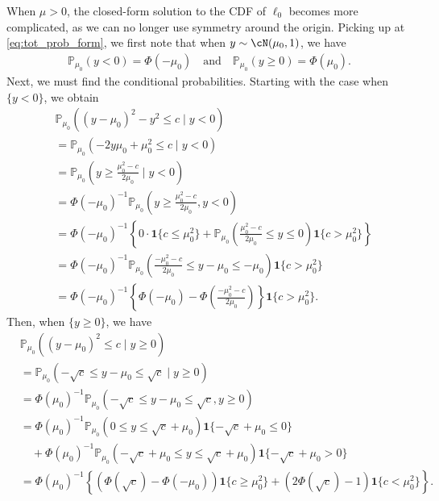 \documentclass[11pt]{article}
\numberwithin{equation}{section}
\numberwithin{figure}{section}
\begin{document}
When $\mu > 0$, the closed-form solution to the CDF of $\ell_0$ becomes more complicated, as we can no longer use symmetry around the origin. 
Picking up at \eqref{eq:tot_prob_form}, we first note that when $y \sim \cN(\mu_0, 1)$, we have
\begin{align*}
    \mathbb{P}_{\mu_0} \left(y < 0 \right) = \Phi(- \mu_0)
    \quad
    \text{and}
    \quad
    \mathbb{P}_{\mu_0} \left(y \geq 0 \right) = \Phi(\mu_0).
\end{align*}
Next, we must find the conditional probabilities. 
Starting with the case when $\{y < 0 \}$, we obtain
\begin{align}
    &\mathbb{P}_{\mu_0} \left((y - \mu_0)^2 - y^2 \leq c \mid y < 0 \right) \\ 
    &= \mathbb{P}_{\mu_0} \left(-2 y \mu_0 + \mu_0^2 \leq c \mid y < 0 \right) \nonumber \\
    &= \mathbb{P}_{\mu_0} \left(y \geq \frac{\mu_0^2 - c}{2 \mu_0} \mid y < 0 \right) \nonumber \\
    &= \Phi(- \mu_0)^{-1} \mathbb{P}_{\mu_0} \left(y \geq \frac{\mu_0^2 - c}{2 \mu_0}, y < 0 \right) \nonumber \\
    &= \Phi(- \mu_0)^{-1} \left\{ 0 \cdot \bm{1} \{c \leq \mu_0^2 \} + \mathbb{P}_{\mu_0} \left( \frac{\mu_0^2 - c}{2 \mu_0} \leq y \leq 0 \right) \bm{1} \{c > \mu_0^2 \} \right\} \nonumber \\
    &= \Phi(- \mu_0)^{-1} \mathbb{P}_{\mu_0} \left( \frac{-\mu_0^2 - c}{2 \mu_0} \leq y - \mu_0 \leq - \mu_0 \right) \bm{1} \{ c > \mu_0^2 \} \nonumber \\
    &= \Phi(- \mu_0)^{-1} \left\{\Phi(- \mu_0) - \Phi\left(\frac{-\mu_0^2 - c}{2 \mu_0} \right) \right\}\bm{1} \{ c > \mu_0^2 \}. \label{eq:cond_y_l_0}
\end{align}
Then, when $\{y \geq 0 \}$, we have
\begin{align}
    & \mathbb{P}_{\mu_0} \left((y - \mu_0)^2 \leq c \mid y \geq 0 \right) \\ 
    &= \mathbb{P}_{\mu_0} \left(- \sqrt{c} \leq y - \mu_0 \leq \sqrt{c} \mid y \geq 0 \right) \nonumber \\
    &= \Phi(\mu_0)^{-1} \mathbb{P}_{\mu_0} \left(- \sqrt{c} \leq y - \mu_0 \leq \sqrt{c}, y \geq 0 \right) \nonumber \\
    &= \Phi(\mu_0)^{-1} \mathbb{P}_{\mu_0} \left(0 \leq y \leq \sqrt{c} + \mu_0 \right) \bm{1} \{ - \sqrt{c} + \mu_0 \leq 0 \} \nonumber \\
    &\quad + \Phi(\mu_0)^{-1} \mathbb{P}_{\mu_0} \left(-\sqrt{c} + \mu_0 \leq y \leq \sqrt{c} + \mu_0 \right) \bm{1} \{ - \sqrt{c} + \mu_0 > 0 \} \nonumber \\
    &= \Phi(\mu_0)^{-1} \left\{ \left( \Phi(\sqrt{c}) - \Phi(- \mu_0) \right) \bm{1} \{ c \geq \mu_0^2 \} + (2 \Phi(\sqrt{c}) - 1) \bm{1} \{ c < \mu_0^2 \} \right\}. \label{eq:cond_y_geq_0}
\end{align}
\end{document}
